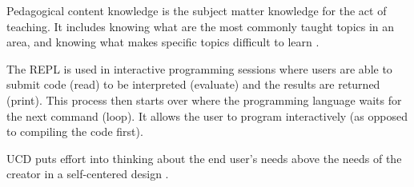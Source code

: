 \documentclass[../main.tex]{subfiles}
\begin{document}
  Pedagogical content knowledge is the subject matter knowledge for the act of teaching.
  It includes knowing what are the most commonly taught topics in an area,
  and knowing what makes specific topics difficult to learn
  \cite{shulmanThoseWhoUnderstand1986}.



  The REPL is used in interactive programming sessions where users are able to
  submit code (read) to be interpreted (evaluate) and the results are returned (print).
  This process then starts over where the programming language waits for the next command (loop).
  It allows the user to program interactively (as opposed to compiling the code first).


  UCD puts effort into thinking about the end user's needs above the needs of the creator in a self-centered design
  \cite{pruittPersonaLifecycleKeeping2006, tognazziniTogSoftwareDesign1748}.

\end{document}
